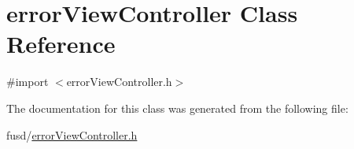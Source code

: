 \hypertarget{interfaceerror_view_controller}{
\section{error\-View\-Controller \-Class \-Reference}
\label{interfaceerror_view_controller}
}


{\ttfamily \#import $<$error\-View\-Controller.\-h$>$}



\-The documentation for this class was generated from the following file\-:\begin{DoxyCompactItemize}
\item 
fusd/\hyperlink{error_view_controller_8h}{error\-View\-Controller.\-h}\end{DoxyCompactItemize}
